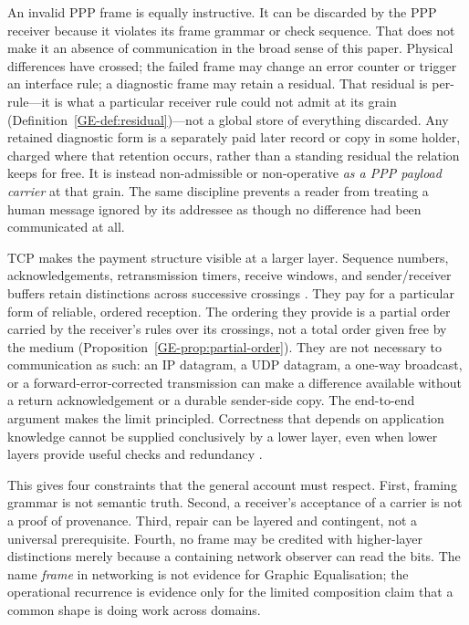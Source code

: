 \documentclass[11pt,a4paper]{article}
\theoremstyle{remark}\newtheorem{remark}[definition]{Remark}
\begin{document}
An invalid PPP frame is equally instructive. It can be discarded by the PPP
receiver because it violates its frame grammar or check sequence. That does not
make it an absence of communication in the broad sense of this paper. Physical
differences have crossed; the failed frame may change an error counter or trigger
an interface rule; a diagnostic frame may retain a residual. That residual is
per-rule---it is what a particular receiver rule could not admit at its grain
(Definition~\ref{GE-def:residual})---not a global store of everything discarded.
Any retained diagnostic form is a separately paid later record or copy in some
holder, charged where that retention occurs, rather than a standing residual the
relation keeps for free. It is instead
non-admissible or non-operative \emph{as a PPP payload carrier} at that grain. The
same discipline prevents a reader from treating a human message ignored by its
addressee as though no difference had been communicated at all.

TCP makes the payment structure visible at a larger layer. Sequence numbers,
acknowledgements, retransmission timers, receive windows, and sender/receiver
buffers retain distinctions across successive crossings \citep{eddy2022,paxson2011}.
They pay for a particular form of reliable, ordered reception. The ordering they
provide is a partial order carried by the receiver's rules over its crossings,
not a total order given free by the medium (Proposition~\ref{GE-prop:partial-order}).
They are not
necessary to communication as such: an IP datagram, a UDP datagram, a one-way
broadcast, or a forward-error-corrected transmission can make a difference
available without a return acknowledgement or a durable sender-side copy. The
end-to-end argument makes the limit principled. Correctness that depends on
application knowledge cannot be supplied conclusively by a lower layer, even
when lower layers provide useful checks and redundancy \citep{saltzer1984}.

This gives four constraints that the general account must respect. First,
framing grammar is not semantic truth. Second, a receiver's acceptance of a
carrier is not a proof of provenance. Third, repair can be layered and
contingent, not a universal prerequisite. Fourth, no frame may be credited with
higher-layer distinctions merely because a containing network observer can read
the bits. The name \emph{frame} in networking is not evidence for Graphic
Equalisation; the operational recurrence is evidence only for the limited
composition claim that a common shape is doing work across domains.
\end{document}
